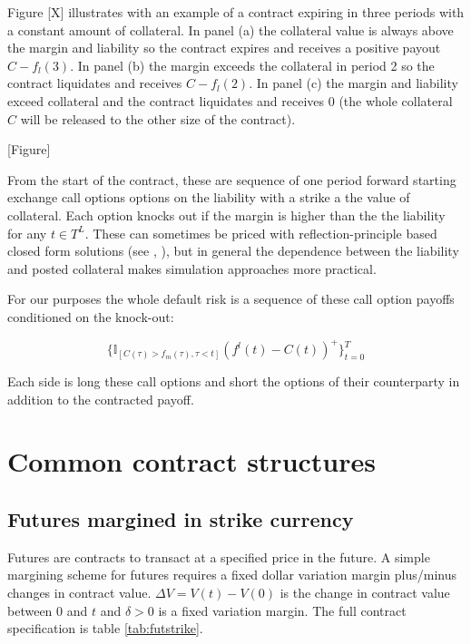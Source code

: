 \documentclass[12pt]{article}
\begin{document}
Figure [X] illustrates with an example of a contract expiring in three periods with a constant amount of collateral. In panel (a) the collateral value is always above the margin and liability so the contract expires and receives a positive payout $C-f_l(3)$. In panel (b) the margin exceeds the collateral in period 2 so the contract liquidates and receives $C-f_l(2)$. In panel (c) the margin and liability exceed collateral and the contract liquidates and receives 0 (the whole collateral $C$ will be released to the other size of the contract).

[Figure]

From the start of the contract, these are sequence of one period forward starting exchange call options options on the liability with a strike a the value of collateral. Each option knocks out if the margin is higher than the the liability for any $t \in T^L$. These can sometimes be priced with reflection-principle based closed form solutions (see \cite{Gaarder02}, \cite{Poulsen06}), but in general the dependence between the liability and posted collateral makes simulation approaches more practical. 

For our purposes the whole default risk is a sequence of these call option payoffs conditioned on the knock-out: 

\begin{equation}
\{\mathbb{I}_{[C(\tau) > f_m(\tau),  \tau<t ]} (f^l(t)-C(t))^+ \}_{t=0}^T  
\end{equation}

Each side is long these call options and short the options of their counterparty in addition to the contracted payoff.

\section{Common contract structures}


\subsection{Futures margined in strike currency} 

Futures are contracts to transact at a specified price in the future. A simple margining scheme for futures requires a fixed dollar variation margin plus/minus changes in contract value.  $\Delta V = V(t)-V(0)$ is the change in contract value between 0 and $t$ and $\delta>0$ is a fixed variation margin. The full contract specification is table \ref{tab:futstrike}.
\end{document}
